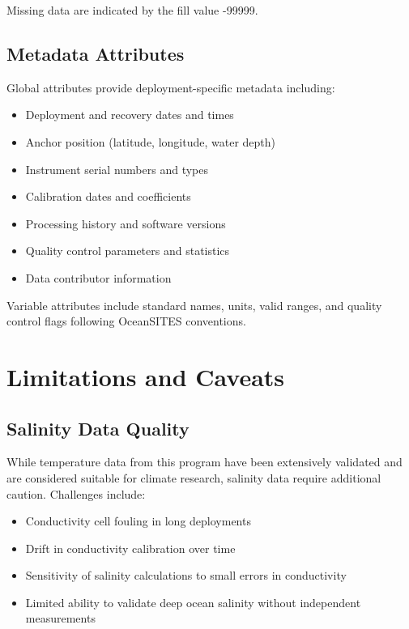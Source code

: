 Missing data are indicated by the fill value -99999.

\subsection{Metadata Attributes}

Global attributes provide deployment-specific metadata including:
\begin{itemize}
    \item Deployment and recovery dates and times
    \item Anchor position (latitude, longitude, water depth)
    \item Instrument serial numbers and types
    \item Calibration dates and coefficients
    \item Processing history and software versions
    \item Quality control parameters and statistics
    \item Data contributor information
\end{itemize}

Variable attributes include standard names, units, valid ranges, and quality control flags following OceanSITES conventions.

\section{Limitations and Caveats}

\subsection{Salinity Data Quality}

While temperature data from this program have been extensively validated and are considered suitable for climate research, salinity data require additional caution. Challenges include:

\begin{itemize}
    \item Conductivity cell fouling in long deployments
    \item Drift in conductivity calibration over time
    \item Sensitivity of salinity calculations to small errors in conductivity
    \item Limited ability to validate deep ocean salinity without independent measurements
\end{itemize}

